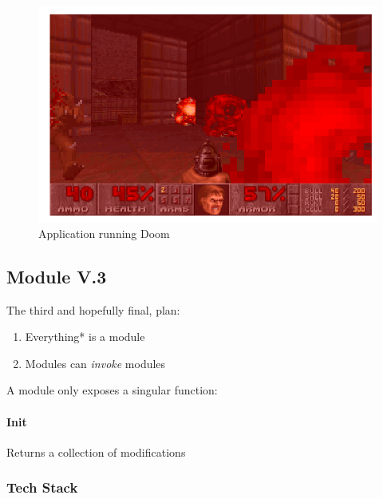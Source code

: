 \begin{figure}
  \centering
  \includegraphics[scale=0.5]{./pics/doom}
  \caption{Application running Doom}
  \label{fig:doom}
\end{figure}

\subsection{Module V.3}

The third and hopefully final, plan:

\begin{enumerate}
  \item Everything* is a module
  \item Modules can \textit{invoke} modules
\end{enumerate}

A module only exposes a singular function:

\paragraph{Init} Returns a collection of modifications

\subsubsection{Tech Stack}

